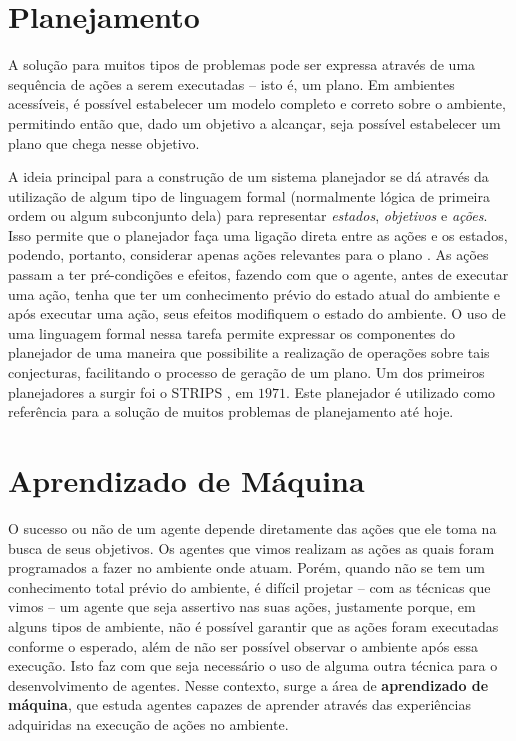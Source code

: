 \section{Planejamento}
A solução para muitos tipos de problemas pode ser expressa através de uma
sequência de ações a serem executadas -- isto é, um plano. Em ambientes
acessíveis, é possível estabelecer um modelo completo e correto sobre o
ambiente, permitindo então que, dado um objetivo a alcançar, seja possível
estabelecer um plano que chega nesse objetivo.

A ideia principal para a construção de um sistema planejador se dá através da
utilização de algum tipo de linguagem formal (normalmente lógica de primeira
ordem ou algum subconjunto dela) para representar \textit{estados},
\textit{objetivos} e \textit{ações}. Isso permite que o planejador faça uma
ligação direta entre as ações e os estados, podendo, portanto, considerar
apenas ações relevantes para o plano \cite[cap. 10]{RussellNorvig200912}.
As ações passam a ter pré-condições e efeitos, fazendo com que o agente, antes
de executar uma ação, tenha que ter um conhecimento prévio do estado atual do
ambiente e após executar uma ação, seus efeitos modifiquem o estado do
ambiente. O uso de uma linguagem formal nessa tarefa permite expressar os
componentes do planejador de uma maneira que possibilite a realização de
operações sobre tais conjecturas, facilitando o processo de geração de um
plano. Um dos primeiros planejadores a surgir foi o STRIPS
\cite{Fikes:1971:SNA:1622876.1622939}, em $1971$. Este planejador é utilizado
como referência para a solução de muitos problemas de planejamento até hoje.


\section{Aprendizado de Máquina}
O sucesso ou não de um agente depende diretamente das ações que ele toma na
busca de seus objetivos. Os agentes que vimos realizam as ações as quais foram
programados a fazer no ambiente onde atuam. Porém, quando não se tem um
conhecimento total prévio do ambiente, é difícil projetar -- com as técnicas
que vimos -- um agente que seja assertivo nas suas ações, justamente porque, em
alguns tipos de ambiente, não é possível garantir que as ações foram executadas
conforme o esperado, além de não ser possível observar o ambiente após essa
execução. Isto faz com que seja necessário o uso de alguma outra técnica para o
desenvolvimento de agentes. Nesse contexto, surge a área de \textbf{aprendizado
de máquina}, que estuda agentes capazes de aprender através das experiências
adquiridas na execução de ações no ambiente.


